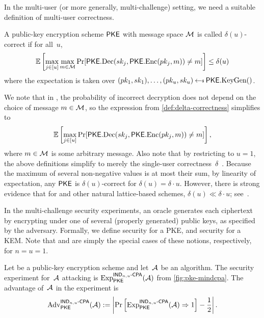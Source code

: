 In the multi-user (or more generally, multi-challenge) setting, we need a suitable definition of multi-user correctness.

\begin{definition}%
  \label{def:delta-correctness}
  A public-key encryption scheme $\textsf{\upshape\mdseries PKE}$ with message space $\mathcal{M}$ is called $\delta(u)$-correct if for all~$u$,
  \[ \operatorname*{\mathbb{E}}\left[ \max_{j \in [u]} \max_{m \in \mathcal{M}} \Pr[\textsf{\upshape\mdseries PKE}.\textrm{\upshape\mdseries Dec}(sk_j, \textsf{\upshape\mdseries PKE}.\textrm{\upshape\mdseries Enc}(pk_j, m)) \neq m] \right] \leq \delta(u) \]
  where the expectation is taken over $(pk_1,sk_1),\ldots,(pk_u, sk_u) \getsr \PKE.\KeyGen()$.
\end{definition}

We note that in \FrodoPKE, the probability of incorrect decryption does not depend on the choice of message $m \in \mathcal{M}$, so the expression from \autoref{def:delta-correctness} simplifies to
\[ \operatorname*{\mathbb{E}}\left[ \max_{j \in [u]} \Pr[\textsf{\upshape\mdseries PKE}.\textrm{\upshape\mdseries Dec}(sk_j, \textsf{\upshape\mdseries PKE}.\textrm{\upshape\mdseries Enc}(pk_j, m)) \neq m] \right] ,
\]
where $m \in \mathcal{M}$ is some arbitrary message.
Also note that by restricting to $u=1$, the above definitions simplify to merely the single-user correctness~$\delta$~\cite{TCC:HofHovKil17}.
Because the maximum of several non-negative values is at most their sum, by linearity of expectation, any $\textsf{\upshape\mdseries PKE}$ is $\delta(u)$-correct for $\delta(u) = \delta \cdot u$.
However, there is strong evidence that for \FrodoPKE and other natural lattice-based schemes, $\delta(u) \ll \delta \cdot u$; see~\cite[Table~1]{CCS:DHKLS21}.

In the multi-challenge security experiments, an oracle generates each ciphertext by encrypting under one of several (properly generated) public keys, as specified by the adversary.
Formally, we define \MINDCPA security for a PKE, and \MINDCCA security for a KEM.
Note that \INDCPA and \INDCCA are simply the special cases of these notions, respectively, for $n=u=1$.

\begin{definition}%
  \label{def:MIND-CPA}
  Let \PKE be a public-key encryption scheme and let~$\mathcal{A}$ be an algorithm.  The \MINDCPA security
  experiment for~$\mathcal{A}$ attacking \PKE is
  $\mathrm{Exp}^{\textsf{\upshape\mdseries \ensuremath{\textsf{\upshape\mdseries IND}_{n,u}\text{-}\textsf{\upshape\mdseries CPA}}}}_{\textsf{\upshape\mdseries PKE}}(\mathcal{A})$ from \autoref{fig:pke-mindcpa}.  The
  advantage of~$\mathcal{A}$ in the experiment is
  \[ \mathrm{Adv}^{\textsf{\upshape\mdseries \ensuremath{\textsf{\upshape\mdseries IND}_{n,u}\text{-}\textsf{\upshape\mdseries CPA}}}}_{\textsf{\upshape\mdseries PKE}}(\mathcal{A}) := \left| \Pr\left[ \mathrm{Exp}^{\textsf{\upshape\mdseries \ensuremath{\textsf{\upshape\mdseries IND}_{n,u}\text{-}\textsf{\upshape\mdseries CPA}}}}_{\textsf{\upshape\mdseries PKE}}(\mathcal{A}) \Rightarrow 1 \right] - \frac{1}{2} \right| . \]
 
\end{definition}

